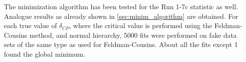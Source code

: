 The minimization algorithm has been tested for the Run 1-7c statistic as well.
Analogue results as already shown in \cref{sec:minim_algorithm} are obtained.
For each true value of $\delta_{CP}$, where the critical value is performed using the Feldman-Cousins method,
and normal hierarchy, 5000 fits were performed on fake data sets of the same type as used for Feldman-Cousins.
About all the fits except 1 found the global minimum.



\clearpage


